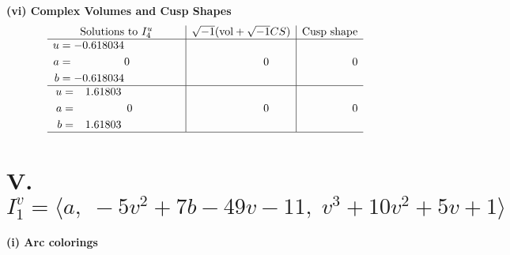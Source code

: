 \documentclass[1p]{elsarticle_modified}
\theoremstyle{definition}
\newcommand{\I}{\sqrt{-1}}
\begin{document}
\newpage\flushleft \textbf{(vi) Complex Volumes and Cusp Shapes}
$$\begin{array}{c|c|c}  
\text{Solutions to }I^u_{4}& \I (\text{vol} + \sqrt{-1}CS) & \text{Cusp shape}\\
 \hline 
\begin{aligned}
u &= -0.618034\phantom{ +0.000000I} \\
a &= \phantom{-0.000000 } 0 \\
b &= -0.618034\phantom{ +0.000000I}\end{aligned}
 & \phantom{-0.000000 } 0 & \phantom{-0.000000 } 0 \\ \hline\begin{aligned}
u &= \phantom{-}1.61803\phantom{ +0.000000I} \\
a &= \phantom{-0.000000 } 0 \\
b &= \phantom{-}1.61803\phantom{ +0.000000I}\end{aligned}
 & \phantom{-0.000000 } 0 & \phantom{-0.000000 } 0\\
 \hline 
 \end{array}$$\newpage\newpage\renewcommand{\arraystretch}{1}
\centering \section*{V. $I^v_{1}= \langle a,\;-5 v^2+7 b-49 v-11,\;v^3+10 v^2+5 v+1 \rangle$}
\flushleft \textbf{(i) Arc colorings}\\
\end{document}
